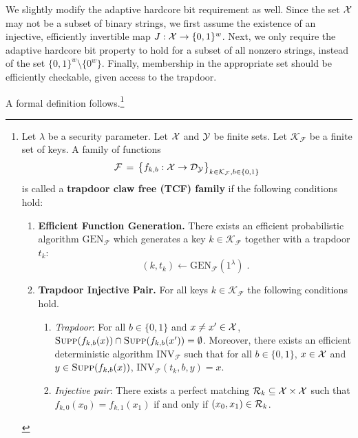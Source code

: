 We slightly modify the adaptive hardcore bit requirement as well. Since the set $\mathcal{X}$ may not be a subset of binary strings, we first assume the existence of an injective, efficiently invertible map $J:\mathcal{X}\to\{0,1\}^w$. Next, we only require the adaptive hardcore bit property to hold for a subset of all nonzero strings, instead of the  set $\{0,1\}^w\setminus \{0^w\}$. Finally, membership in the appropriate set should be efficiently checkable, given access to the trapdoor. 

A formal definition follows.\footnote{ 

\begin{definition}\label{def:trapdoorclawfree}
Let $\lambda$ be a security parameter. Let $\mathcal{X}$ and $\mathcal{Y}$ be finite sets.
 Let $\mathcal{K}_{\mathcal{F}}$ be a finite set of keys. A family of functions 
$$\mathcal{F} \,=\, \big\{f_{k,b} : \mathcal{X}\rightarrow \mathcal{D}_{\mathcal{Y}} \big\}_{k\in \mathcal{K}_{\mathcal{F}},b\in\{0,1\}}$$
is called a \textbf{trapdoor claw free (TCF) family} if the following conditions hold:

\begin{enumerate}
\item{\textbf{Efficient Function Generation.}} There exists an efficient probabilistic algorithm $\textrm{GEN}_{\mathcal{F}}$ which generates a key $k\in \mathcal{K}_{\mathcal{F}}$ together with a trapdoor $t_k$: 
$$(k,t_k) \leftarrow \textrm{GEN}_{\mathcal{F}}(1^\lambda)\;.$$
\item{\textbf{Trapdoor Injective Pair.}} For all keys $k\in \mathcal{K}_{\mathcal{F}}$ the following conditions hold. 
\begin{enumerate}
\item \textit{Trapdoor}: For all $b\in\{0,1\}$ and $x\neq x' \in \mathcal{X}$, $\textsc{Supp}(f_{k,b}(x))\cap \textsc{Supp}(f_{k,b}(x')) = \emptyset$. Moreover, there exists an efficient deterministic algorithm $\textrm{INV}_{\mathcal{F}}$ such that for all $b\in \{0,1\}$,  $x\in \mathcal{X}$ and $y\in \textsc{Supp}(f_{k,b}(x))$, $\textrm{INV}_{\mathcal{F}}(t_k,b,y) = x$. 
\item \textit{Injective pair}: There exists a perfect matching $\mathcal{R}_k \subseteq \mathcal{X} \times \mathcal{X}$ such that $f_{k,0}(x_0) = f_{k,1}(x_1)$ if and only if $(x_0,x_1)\in \mathcal{R}_k$. \end{enumerate}


\end{enumerate}
\end{definition}}
